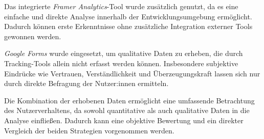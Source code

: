 Das integrierte \textit{Framer Analytics}-Tool wurde zusätzlich genutzt, 
da es eine einfache und direkte Analyse innerhalb der Entwicklungsumgebung 
ermöglicht. Dadurch können erste Erkenntnisse ohne zusätzliche Integration 
externer Tools gewonnen werden.

\textit{Google Forms} wurde eingesetzt, um qualitative Daten zu erheben, 
die durch Tracking-Tools allein nicht erfasst werden können. 
Insbesondere subjektive Eindrücke wie Vertrauen, Verständlichkeit und 
Überzeugungskraft lassen sich nur durch direkte Befragung der Nutzer:innen 
ermitteln.

Die Kombination der erhobenen Daten ermöglicht 
eine umfassende Betrachtung des Nutzerverhaltens, da sowohl 
quantitative als auch qualitative Daten in die Analyse einfließen. 
Dadurch kann eine objektive Bewertung und ein direkter Vergleich
der beiden Strategien vorgenommen werden.
